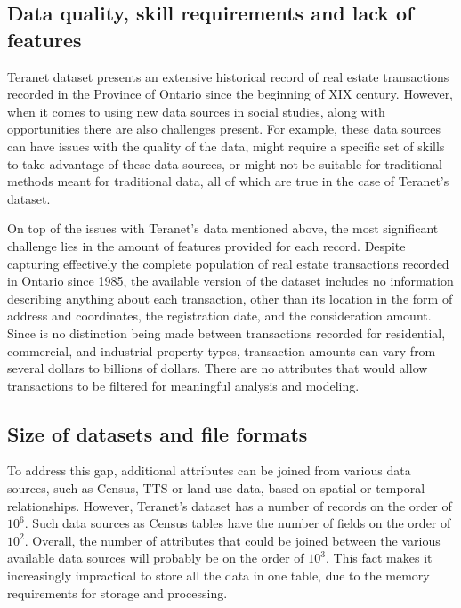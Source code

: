 \subsection{Data quality, skill requirements and lack of features} \label{subsec:challenges_quality_skills_features}

Teranet dataset presents an extensive historical record of real estate transactions recorded in the Province of Ontario since the beginning of XIX century.
However, when it comes to using new data sources in social studies, along with opportunities there are also challenges present.
For example, these data sources can have issues with the quality of the data, might require a specific set of skills to take advantage of these data sources, or might not be suitable for traditional methods meant for traditional data\cite{Arribas-Bel2014}, all of which are true in the case of Teranet's dataset.

On top of the issues with Teranet's data mentioned above, the most significant challenge lies in the amount of features provided for each record.
Despite capturing effectively the complete population of real estate transactions recorded in Ontario since 1985, the available version of the dataset includes no information describing anything about each transaction, other than its location in the form of address and coordinates, the registration date, and the consideration amount.
Since is no distinction being made between transactions recorded for residential, commercial, and industrial property types, transaction amounts can vary from several dollars to billions of dollars.
There are no attributes that would allow transactions to be filtered for meaningful analysis and modeling.

\subsection{Size of datasets and file formats} \label{subsec:challenges_size_and_formats}

To address this gap, additional attributes can be joined from various data sources, such as Census, TTS or land use data, based on spatial or temporal relationships.
However, Teranet's dataset has a number of records on the order of $10^6$.
Such data sources as Census tables have the number of fields on the order of $10^2$.
Overall, the number of attributes that could be joined between the various available data sources will probably be on the order of $10^3$.
This fact makes it increasingly impractical to store all the data in one table, due to the memory requirements for storage and processing.

